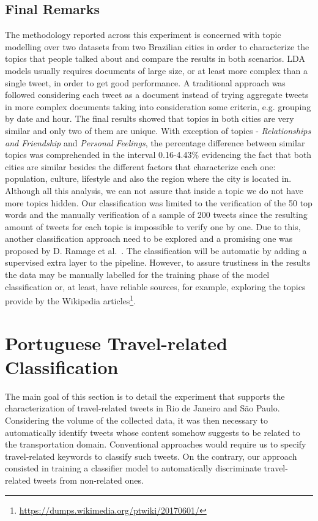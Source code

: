 \subsection{Final Remarks}
The methodology reported across this experiment is concerned with topic modelling over two datasets from two Brazilian cities in order to characterize the topics that people talked about and compare the results in both scenarios. LDA models usually requires documents of large size, or at least more complex than a single tweet, in order to get good performance. A traditional approach was followed considering each tweet as a document instead of trying aggregate tweets in more complex documents taking into consideration some criteria, e.g. grouping by date and hour. The final results showed that topics in both cities are very similar and only two of them are unique. With exception of topics - \textit{Relationships and Friendship} and \textit{Personal Feelings}, the percentage difference between similar topics was comprehended in the interval 0.16-4.43\% evidencing the fact that both cities are similar besides the different factors that characterize each one: population, culture, lifestyle and also the region where the city is located in. Although all this analysis, we can not assure that inside a topic we do not have more topics hidden. Our classification was limited to the verification of the 50 top words and the manually verification of a sample of 200 tweets since the resulting amount of tweets for each topic is impossible to verify one by one. Due to this, another classification approach need to be explored and a promising one was proposed by D. Ramage et al.~\cite{ramage2010characterizing}. The classification will be automatic by adding a supervised extra layer to the pipeline. However, to assure trustiness in the results the data may be manually labelled for the training phase of the model classification or, at least, have reliable sources, for example, exploring the topics provide by the Wikipedia articles\footnote{\url{https://dumps.wikimedia.org/ptwiki/20170601/}}.

\section{Portuguese Travel-related Classification}\label{sec:travel_related_classification}
The main goal of this section is to detail the experiment that supports the characterization of travel-related tweets in Rio de Janeiro and São Paulo. Considering the volume of the collected data, it was then necessary to automatically identify tweets whose content somehow suggests to be related to the transportation domain. Conventional approaches would require us to specify travel-related keywords to classify such tweets. On the contrary, our approach consisted in training a classifier model to automatically discriminate travel-related tweets from non-related ones. 

